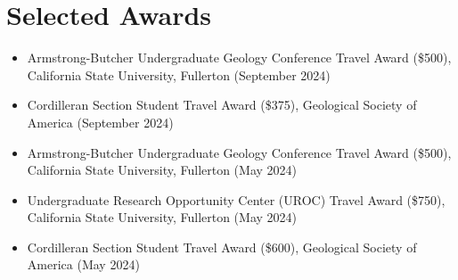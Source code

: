 
\section{Selected Awards}
\begin{itemize}
\item Armstrong-Butcher Undergraduate Geology Conference Travel Award (\$500), California State University, Fullerton (September 2024)
\item Cordilleran Section Student Travel Award (\$375), Geological Society of America (September 2024)
\item Armstrong-Butcher Undergraduate Geology Conference Travel Award (\$500), California State University, Fullerton (May 2024)
\item Undergraduate Research Opportunity Center (UROC) Travel Award (\$750), California State University, Fullerton (May 2024)
\item Cordilleran Section Student Travel Award (\$600), Geological Society of America (May 2024)
\end{itemize}

